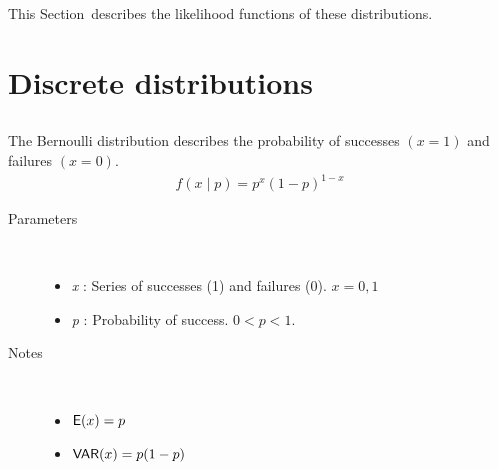 \documentclass[]{jss}
\begin{document}
This Section~describes the likelihood functions of these distributions.

\section{Discrete distributions}

\subsection[bernoulli]{}
     
The Bernoulli distribution describes the probability of successes $(x=1)$ and
failures $(x=0)$.
\begin{eqnarray*}
    f(x \mid p) = p^{x} (1-p)^{1-x}
\end{eqnarray*}

\begin{description}
\item[Parameters] \ 

\begin{itemize}
\item {} 
\emph{x} : Series of successes (1) and failures (0). $x=0,1$

\item {} 
\emph{p} : Probability of success. $0 < p < 1$.
\end{itemize}
\item[Notes] \ 
\begin{itemize}
\item {} 
$\mathsf{E}(x)= p$
\item {} 
$\mathsf{VAR}(x)= p(1-p)$
\end{itemize}
\end{description}


\subsection[binomial]{}
\end{document}

